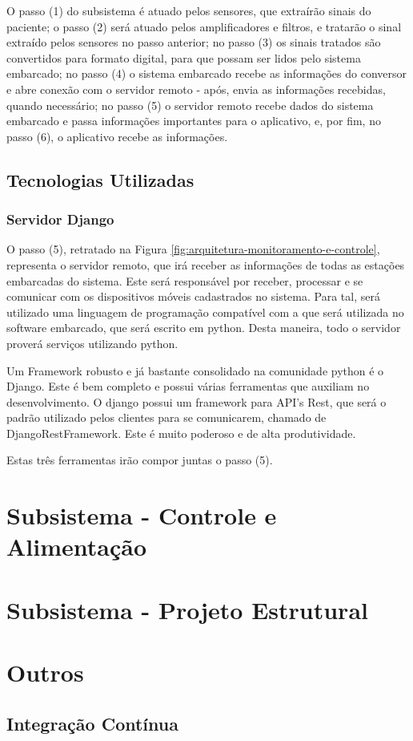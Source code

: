 O passo (1) do subsistema é atuado pelos sensores, que extraírão sinais do paciente;
o passo (2) será atuado pelos amplificadores e filtros, e tratarão o sinal
extraído pelos sensores no passo anterior; no passo (3) os sinais tratados
são convertidos para formato digital, para que possam ser lidos pelo sistema
embarcado; no passo (4) o sistema embarcado recebe as informações do conversor
e abre conexão com o servidor remoto - após, envia as informações recebidas,
quando necessário; no passo (5) o servidor remoto recebe dados do sistema
embarcado e passa informações importantes para o aplicativo, e, por fim,
no passo (6), o aplicativo recebe as informações.

\subsection{Tecnologias Utilizadas}

\subsubsection{Servidor Django}
\label{sub:servidor_django}
O passo (5), retratado na Figura \ref{fig:arquitetura-monitoramento-e-controle},
representa o servidor remoto, que irá receber as informações de todas as
estações embarcadas do sistema. Este será responsável por receber, processar
e se comunicar com os dispositivos móveis cadastrados no sistema. Para tal,
será utilizado uma linguagem de programação compatível com a que será utilizada
no software embarcado, que será escrito em python. Desta maneira, todo
o servidor proverá serviços utilizando python.

Um Framework robusto e já bastante consolidado na comunidade python é o Django.
Este é bem completo e possui várias ferramentas que auxiliam no desenvolvimento.
O django possui um framework para API's Rest, que será o padrão utilizado pelos
clientes para se comunicarem, chamado de DjangoRestFramework. Este é muito poderoso
e de alta produtividade.

Estas três ferramentas irão compor juntas o passo (5).

\section{Subsistema - Controle e Alimentação}

\section{Subsistema - Projeto Estrutural}

\section{Outros}

\subsection{Integração Contínua}
